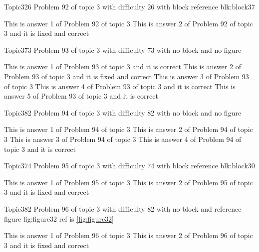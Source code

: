\documentclass[master]{exam}
\begin{document}
\begin{problem}[requires=blk:block37]{Topic3}{26}
	Problem 92 of topic 3 with difficulty 26 with block reference blk:block37
	\begin{answers}
		\answer This is answer 1 of Problem 92 of topic 3 
		 This is answer 2 of Problem 92 of topic 3 and it is fixed and correct
	\end{answers}
\end{problem}

\begin{problem}{Topic3}{73}
	Problem 93 of topic 3 with difficulty 73 with no block and no figure
	\begin{answers}
		\answer[correct] This is answer 1 of Problem 93 of topic 3 and it is correct
		 This is answer 2 of Problem 93 of topic 3 and it is fixed and correct
		\answer This is answer 3 of Problem 93 of topic 3 
		\answer[correct] This is answer 4 of Problem 93 of topic 3 and it is correct
		\answer[correct] This is answer 5 of Problem 93 of topic 3 and it is correct
	\end{answers}
\end{problem}

\begin{problem}{Topic3}{82}
	Problem 94 of topic 3 with difficulty 82 with no block and no figure
	\begin{answers}
		\answer This is answer 1 of Problem 94 of topic 3 
		\answer This is answer 2 of Problem 94 of topic 3 
		\answer This is answer 3 of Problem 94 of topic 3 
		\answer[correct] This is answer 4 of Problem 94 of topic 3 and it is correct
	\end{answers}
\end{problem}

\begin{problem}[requires=blk:block30]{Topic3}{74}
	Problem 95 of topic 3 with difficulty 74 with block reference blk:block30
	\begin{answers}
		\answer This is answer 1 of Problem 95 of topic 3 
		 This is answer 2 of Problem 95 of topic 3 and it is fixed and correct
	\end{answers}
\end{problem}

\begin{problem}{Topic3}{82}
	Problem 96 of topic 3 with difficulty 82 with no block and reference figure fig:figure32 ref is \ref{fig:figure32}
	\begin{answers}
		\answer This is answer 1 of Problem 96 of topic 3 
		 This is answer 2 of Problem 96 of topic 3 and it is fixed and correct
	\end{answers}
\end{problem}
\end{document}
